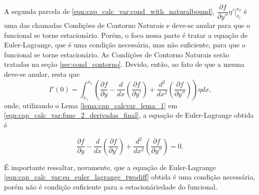 \documentclass[
	12pt,				%
	openright,			%
    twoside,			%
	a4paper,			%
	english,			%
	french,				%
	spanish,			%
	brazil				%
	]{abntex2}
\numberwithin{lema}{chapter}
\numberwithin{teorema}{chapter}
\numberwithin{definicao}{chapter}
\numberwithin{exemplo}{chapter}
\numberwithin{figure}{chapter}
\begin{document}
A segunda parcela de \eqref{eqn:cap_calc_var:cond_with_naturalbound}, $\dfrac{\partial f}{\partial y''}\eta '\Big|_{x_1}^{x_2}$ é uma das chamadas Condições de Contorno Naturais e deve-se anular para que o funcional se torne estacionário. Porém, o foco nessa parte é tratar a equação de Euler-Lagrange, que é uma condição necessária, mas não suficiente, para que o funcional se torne estacionário. As Condições de Contorno Naturais serão tratadas na seção \ref{sec:cond_contorno}. Devido, então, ao fato de que a mesma deve-se anular, resta que
\begin{equation}
	\label{eqn:cap_calc_var:func_2_derivadas_final}
	I'(0)=
	\int_{x_1}^{x_2}
	\left (
		\frac{\partial f}{\partial y}
	-
		\frac{d}{dx}\left (
			\frac{\partial f}{\partial y'}
		\right )
	+
		\frac{d^2}{dx^2}\left (
			\frac{\partial f}{\partial y''}
		\right )
	\right ) \eta dx
	\text{,}
\end{equation}
onde, utilizando o Lema \ref{lema:cap_calcvar_lema_1} em \eqref{eqn:cap_calc_var:func_2_derivadas_final}, a equação de Euler-Lagrange obtida é

\begin{equation}
	\label{eqn:cap_calc_var:eq_euler_lagrange_twodiff}
	\frac{\partial f}{\partial y}
	-
	\frac{d}{dx}\left (
		\frac{\partial f}{\partial y'}
	\right )
	+
	\frac{d^2}{dx^2}\left (
		\frac{\partial f}{\partial y''}
	\right )
	=0 \text{.}
\end{equation}

É importante ressaltar, novamente, que a equação de Euler-Lagrange \eqref{eqn:cap_calc_var:eq_euler_lagrange_twodiff} obtida é uma condição necessária, porém não é condição suficiente para a estacionáriedade do funcional.
\end{document}
